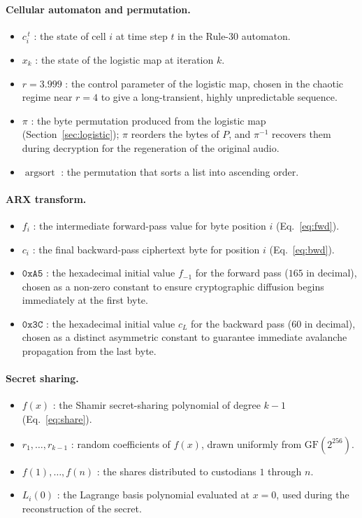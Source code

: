 \documentclass[pdflatex,sn-mathphys-num]{sn-jnl}%
\theoremstyle{thmstyleone}%
\theoremstyle{thmstyletwo}%
\theoremstyle{thmstylethree}%
\begin{document}
\paragraph{Cellular automaton and permutation.}
\begin{itemize}[leftmargin=2em]
\item $c_i^{\,t}$ : the state of cell $i$ at time step $t$ in the Rule-30 automaton.
\item $x_k$ : the state of the logistic map at iteration $k$.
\item $r=3.999$ : the control parameter of the logistic map, chosen in the chaotic regime near $r=4$ to give a long-transient, highly unpredictable sequence.
\item $\pi$ : the byte permutation produced from the logistic map (Section~\ref{sec:logistic}); $\pi$ reorders the bytes of $P$, and $\pi^{-1}$ recovers them during decryption for the regeneration of the original audio.
\item $\operatorname{argsort}$ : the permutation that sorts a list into ascending order.
\end{itemize}

\paragraph{ARX transform.}
\begin{itemize}[leftmargin=2em]
\item $f_i$ : the intermediate forward-pass value for byte position $i$ (Eq.~\eqref{eq:fwd}).
\item $c_i$ : the final backward-pass ciphertext byte for position $i$ (Eq.~\eqref{eq:bwd}).
\item $\mathtt{0xA5}$ : the hexadecimal initial value $f_{-1}$ for the forward pass ($165$ in decimal), chosen as a non-zero constant to ensure cryptographic diffusion begins immediately at the first byte.
\item $\mathtt{0x3C}$ : the hexadecimal initial value $c_L$ for the backward pass ($60$ in decimal), chosen as a distinct asymmetric constant to guarantee immediate avalanche propagation from the last byte.
\end{itemize}

\paragraph{Secret sharing.}
\begin{itemize}[leftmargin=2em]
\item $f(x)$ : the Shamir secret-sharing polynomial of degree $k-1$ (Eq.~\eqref{eq:share}).
\item $r_1,\dots,r_{k-1}$ : random coefficients of $f(x)$, drawn uniformly from $\mathrm{GF}(2^{256})$.
\item $f(1),\dots,f(n)$ : the shares distributed to custodians $1$ through $n$.
\item $L_i(0)$ : the Lagrange basis polynomial evaluated at $x=0$, used during the reconstruction of the secret.
\end{itemize}
\end{document}
